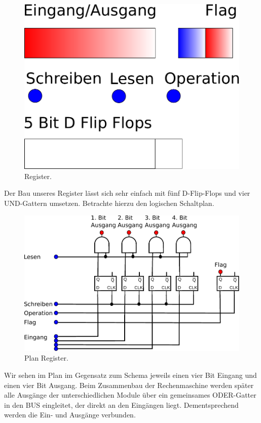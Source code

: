 \documentclass[11pt,a4paper,leqno]{report}
\numberwithin{equation}{chapter}
\begin{document}
\begin{figure}[H]
	\begin{center}
		\includegraphics[scale=0.3]{register.pdf}
		\caption{Register.}
	\end{center}
\end{figure}
\noindent
Der Bau unseres Register l\"asst sich sehr einfach mit f\"unf D-Flip-Flops und vier UND-Gattern umsetzen. Betrachte hierzu den logischen Schaltplan.
\begin{figure}[H]
	\begin{center}
		\includegraphics[scale=0.7]{reg.pdf}
		\caption{Plan Register.}
	\end{center}
\end{figure}
\noindent
Wir sehen im Plan im Gegensatz zum Schema jeweils einen vier Bit Eingang und einen vier Bit Ausgang. Beim Zusammenbau der Rechenmaschine werden sp\"ater alle Ausg\"ange der unterschiedlichen Module \"uber ein gemeinsames ODER-Gatter in den BUS eingleitet, der direkt an den Eing\"angen liegt. Dementsprechend werden die Ein- und Ausg\"ange verbunden.
\newpage
\end{document}
